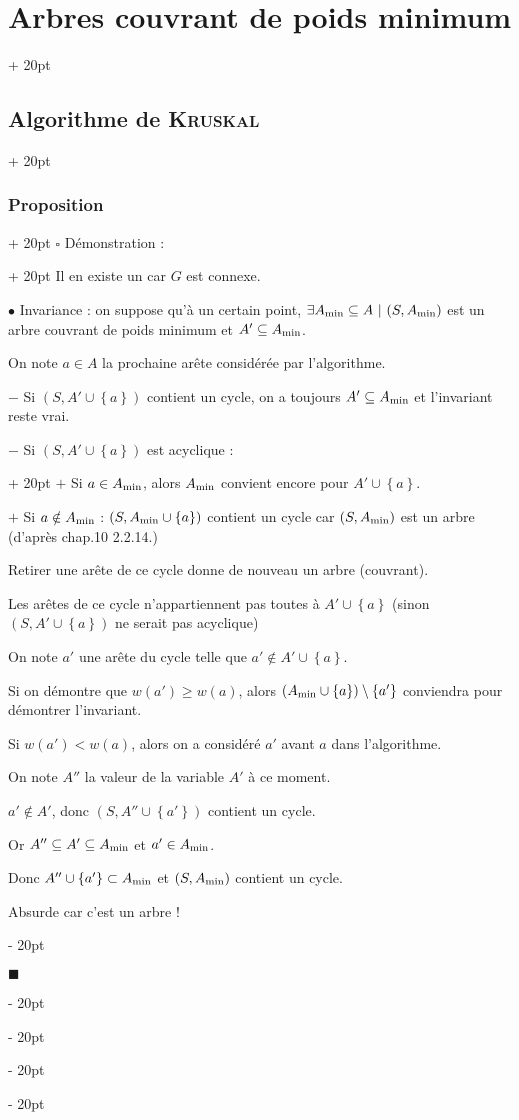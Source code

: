 \documentclass[a4paper, 12pt, twoside]{article}
\newcommand{\set}[1]{\left\{ #1 \right\}}
\renewcommand{\ge}{\geqslant}
\newcommand{\ind}[1][20pt]{\advance\leftskip + #1}
\newcommand{\deind}[1][20pt]{\advance\leftskip - #1}
\newenvironment{indt}[2][20pt]{#2 \par \ind[#1]}{\par \deind} %
\newenvironment{proof}[1][{Démonstration :}]{\begin{indt}{$\square$ #1}}{$\blacksquare$ \end{indt}}
\begin{document}
\begin{indt}{\section{Arbres couvrant de poids minimum}}
\begin{indt}{\subsection{Algorithme de \textsc{Kruskal}}}
\begin{indt}{\subsubsection{Proposition}}
\begin{proof}
                    Il en existe un car $G$ est connexe.

                    \vspace{6pt}
                    
                    $\bullet$ Invariance : on suppose qu'à un certain point, $\exists A_{\rm min} \subseteq A\ |\ (S, A_{\rm min})$ est un arbre couvrant de poids minimum et $A' \subseteq A_{\rm min}$.

                    On note $a \in A$ la prochaine arête considérée par l'algorithme.

                    $-$ Si $(S, A' \cup \set a)$ contient un cycle, on a toujours $A' \subseteq A_{\rm min}$ et l'invariant reste vrai.

                    \begin{indt}{$-$ Si $(S, A' \cup \set a)$ est acyclique :}
                        $+$ Si $a \in A_{\rm min}$, alors $A_{\rm min}$ convient encore pour $A' \cup \set a$.

                        $+$ Si $a \notin A_{\rm min}$ : $(S, A_{\rm min} \cup \set a)$ contient un cycle car $(S, A_{\rm min})$ est un arbre (d'après chap.10 2.2.14.)

                        Retirer une arête de ce cycle donne de nouveau un arbre (couvrant).

                        Les arêtes de ce cycle n'appartiennent pas toutes à $A' \cup \set a$ (sinon $(S, A' \cup \set a)$ ne serait pas acyclique)

                        On note $a'$ une arête du cycle telle que $a' \notin A' \cup \set a$.

                        Si on démontre que $w(a') \ge w(a)$, alors $(A_{\rm min} \cup \set a) \setminus \set{a'}$ conviendra pour démontrer l'invariant.

                        Si $w(a') < w(a)$, alors on a considéré $a'$ avant $a$ dans l'algorithme.

                        On note $A''$ la valeur de la variable $A'$ à ce moment.

                        $a' \notin A'$, donc $(S, A'' \cup \set {a'})$ contient un cycle.

                        Or $A'' \subseteq A' \subseteq A_{\rm min}$ et $a' \in A_{\rm min}$.

                        Donc $A'' \cup \set {a'} \subset A_{\rm min}$ et $(S, A_{\rm min})$ contient un cycle.

                        Absurde car c'est un arbre !
                    \end{indt}


\end{proof}
\end{indt}
\end{indt}
\end{indt}
\end{document}
